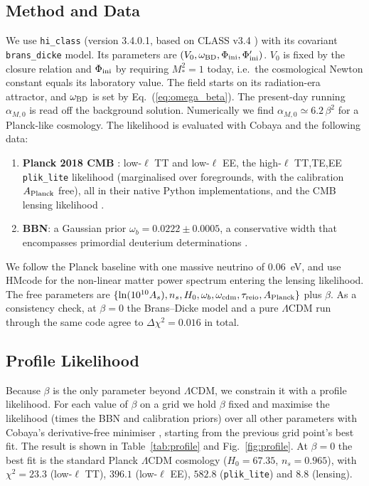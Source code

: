 \documentclass[11pt,a4paper]{article}
\begin{document}
\subsection{Method and Data}
We use \texttt{hi\_class} \cite{Zumalacarregui2017,Bellini2020} (version 3.4.0.1, based on CLASS v3.4 \cite{Lesgourgues2011,Blas2011}) with its covariant \texttt{brans\_dicke} model. Its parameters are $(V_0, \omega_{\rm BD}, \Phi_{\rm ini}, \Phi'_{\rm ini})$. $V_0$ is fixed by the closure relation and $\Phi_{\rm ini}$ by requiring $M_*^2 = 1$ today, i.e.\ the cosmological Newton constant equals its laboratory value. The field starts on its radiation-era attractor, and $\omega_{\rm BD}$ is set by Eq.~(\ref{eq:omega_beta}). The present-day running $\alpha_{M,0}$ is read off the background solution. Numerically we find $\alpha_{M,0} \simeq 6.2\,\beta^2$ for a Planck-like cosmology. The likelihood is evaluated with Cobaya \cite{Torrado2021} and the following data:
\begin{enumerate}
    \item \textbf{Planck 2018 CMB} \cite{Planck2018V,Planck2018VI}: low-$\ell$ TT and low-$\ell$ EE, the high-$\ell$ TT,TE,EE \texttt{plik\_lite} likelihood (marginalised over foregrounds, with the calibration $A_{\rm Planck}$ free), all in their native Python implementations, and the CMB lensing likelihood \cite{Planck2018VIII}.
    \item \textbf{BBN}: a Gaussian prior $\omega_b = 0.0222 \pm 0.0005$, a conservative width that encompasses primordial deuterium determinations \cite{Cooke2018}.
\end{enumerate}
We follow the Planck baseline with one massive neutrino of $0.06$~eV, and use HMcode \cite{Mead2021} for the non-linear matter power spectrum entering the lensing likelihood. The free parameters are $\{\ln(10^{10}A_s), n_s, H_0, \omega_b, \omega_{\rm cdm}, \tau_{\rm reio}, A_{\rm Planck}\}$ plus $\beta$. As a consistency check, at $\beta = 0$ the Brans--Dicke model and a pure $\Lambda$CDM run through the same code agree to $\Delta\chi^2 = 0.016$ in total.

\subsection{Profile Likelihood}
\label{sec:results}
Because $\beta$ is the only parameter beyond $\Lambda$CDM, we constrain it with a profile likelihood. For each value of $\beta$ on a grid we hold $\beta$ fixed and maximise the likelihood (times the BBN and calibration priors) over all other parameters with Cobaya's derivative-free minimiser \cite{Cartis2019}, starting from the previous grid point's best fit. The result is shown in Table~\ref{tab:profile} and Fig.~\ref{fig:profile}. At $\beta = 0$ the best fit is the standard Planck $\Lambda$CDM cosmology ($H_0 = 67.35$, $n_s = 0.965$), with $\chi^2 = 23.3$ (low-$\ell$ TT), $396.1$ (low-$\ell$ EE), $582.8$ (\texttt{plik\_lite}) and $8.8$ (lensing).
\end{document}
